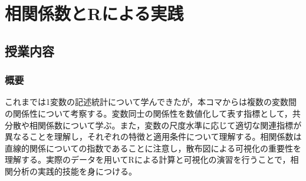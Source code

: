 \section{相関係数とRによる実践}
\label{b06_Corr}

\subsection{授業内容}

\subsubsection{概要}
これまでは1変数の記述統計について学んできたが，本コマからは複数の変数間の関係性について考察する。変数同士の関係性を数値化して表す指標として，共分散や相関係数について学ぶ。また，変数の尺度水準に応じて適切な関連指標が異なることを理解し，それぞれの特徴と適用条件について理解する。相関係数は直線的関係についての指数であることに注意し，散布図による可視化の重要性を理解する。実際のデータを用いてRによる計算と可視化の演習を行うことで，相関分析の実践的技能を身につける。

